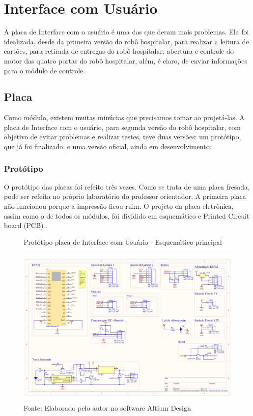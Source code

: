 \documentclass[../poliXuniversity_hospital_-USP-report.tex]{subfiles}
\begin{document}
\clearpage

\section{Interface com Usuário}

A placa de Interface com o usuário é uma das que deram mais problemas. Ela foi idealizada, desde da primeira versão do robô hospitalar, para realizar a leitura de cartões, para retirada de entregas do robô hospitalar, abertura e controle do motor das quatro portas do robô hospitalar, além, é claro, de enviar informações para o módulo de controle.

\subsection{Placa}

Como módulo, existem muitas minúcias que precisamos tomar ao projetá-las. A placa de Interface com o usuário, para segunda versão do robô hospitalar, com objetivo de evitar problemas e realizar testes, teve duas versões: um protótipo, que já foi finalizado, e uma versão oficial, ainda em desenvolvimento. 

\subsubsection{Protótipo}

O protótipo das placas foi refeito três vezes. Como se trata de uma placa fresada, pode ser refeita no próprio laboratório do professor orientador. A primeira placa não funcionou porque a impressão ficou ruim. O projeto da placa eletrônica, assim como o de todos os módulos, foi dividido em esquemático e Printed Circuit board (PCB) . 

\begin{figure}[!ht]
\centering
    \caption{Protótipo placa de Interface com Usuário - Esquemático principal }
    \centering %
    \includegraphics[width=15cm]{modulos/InterfaceComUsuario-1.png}
    \caption*{Fonte: Elaborado pelo autor no software Altium Design\cite{altium21} }
    \label{Protótipo placa de ## - Esquemático principal}
\end{figure}
\end{document}
